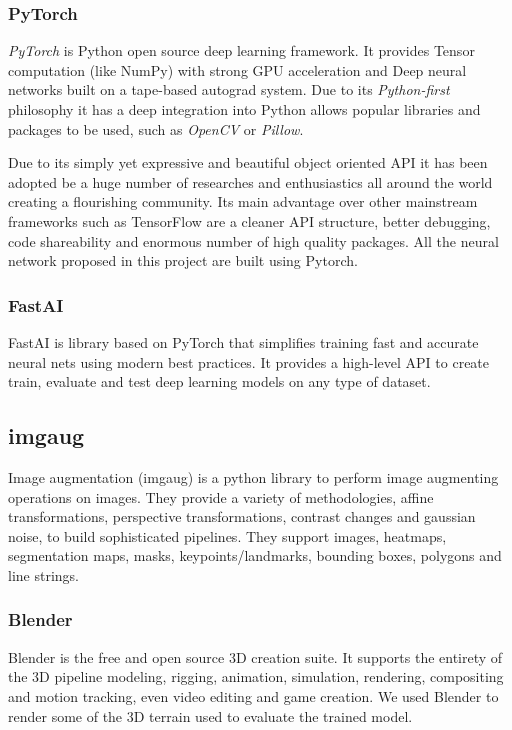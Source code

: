 \documentclass[../document.tex]{subfiles}
\begin{document}
\subsubsection{PyTorch}
\emph{PyTorch} is Python open source deep learning framework. It provides Tensor computation (like NumPy) with strong GPU acceleration and Deep neural networks built on a tape-based autograd system. Due to its \emph{Python-first} philosophy it has a deep integration into Python allows popular libraries and packages to be used, such as \emph{OpenCV} or \emph{Pillow}.  

Due to its simply yet expressive and beautiful object oriented API it has been adopted be a huge number of researches and enthusiastics all around the world creating a flourishing community. 
Its main advantage over other mainstream frameworks such as TensorFlow  are a cleaner API structure, better debugging, code shareability and enormous number of high quality packages. All the neural network proposed in this project are built using Pytorch.

\subsubsection{FastAI}
FastAI is  library based on PyTorch that simplifies training fast and accurate neural nets using modern best practices. It provides a high-level API to create train, evaluate and test deep learning models on any type of dataset.

\subsection{imgaug}
Image augmentation (imgaug) is a python library to perform image augmenting operations on images. They provide a variety of methodologies, affine transformations, perspective transformations, contrast changes and gaussian noise,  to build sophisticated pipelines. They support images,  heatmaps, segmentation maps, masks, keypoints/landmarks, bounding boxes, polygons and line strings.

\subsubsection{Blender}
Blender is the free and open source 3D creation suite. It supports the entirety of the 3D pipeline modeling, rigging, animation, simulation, rendering, compositing and motion tracking, even video editing and game creation. We used Blender to render some of the 3D terrain used to evaluate the trained model.
\end{document}

